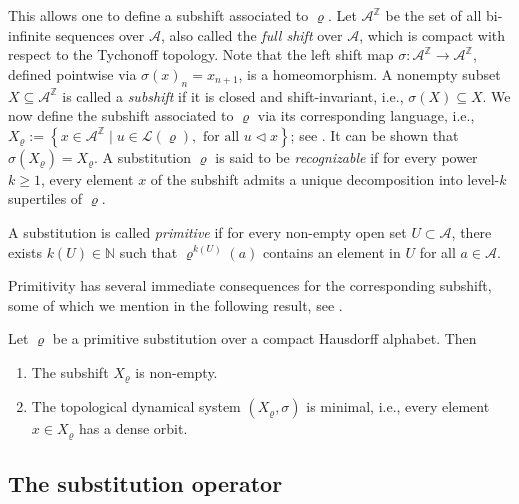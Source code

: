This allows one to define a subshift associated to $\varrho$. Let $\mathcal{A}^{\mathbb{Z}}$ be the set of all bi-infinite sequences over $\mathcal{A}$, also called the \emph{full shift} over $\mathcal{A}$, which is compact with respect to the Tychonoff topology. Note that the left shift map $\sigma\colon \mathcal{A}^{\mathbb{Z}}\to \mathcal{A}^{\mathbb{Z}}$, defined pointwise via $\sigma(x)_n=x_{n+1}$, is a homeomorphism. 
A nonempty subset $X\subseteq \mathcal{A}^{\mathbb{Z}}$ is called a \emph{subshift} if it is closed and shift-invariant, i.e., $\sigma(X)\subseteq X$. 
We now define the subshift associated to $\varrho$ via its corresponding language, i.e., $X_{\varrho}:=\left\{x\in\mathcal{A}^{\mathbb{Z}}\mid u\in\mathcal{L}(\varrho), \text{ for all }u\triangleleft x\right\}$; see \cite{MRW2}. It can be shown that $\sigma(X_{\varrho})=X_{\varrho}$. 
A substitution $\varrho$ is said to be \emph{recognizable} if for every power $k\geqslant 1$, every element $x$ of the subshift admits a unique decomposition into level-$k$ supertiles of $\varrho$.

\begin{definition}
A substitution is called \emph{primitive} if for every non-empty open set $U\subset \mathcal{A}$, there exists $k(U)\in \mathbb{N}$ such that $\varrho^{k(U)}(a)$ contains an element in $U$ for all $a\in\mathcal{A}$. 
\end{definition}

Primitivity has several immediate consequences for the corresponding subshift, some of which we mention in the following result, see \cite[Thm. 3.30]{MRW2}. %

\begin{prop}
Let $\varrho$ be a primitive substitution over a compact Hausdorff alphabet. Then 
\begin{enumerate}
\item[\textnormal{(i)}] The subshift $X_{\varrho}$ is non-empty.
\item[\textnormal{(ii)}] The topological dynamical system $(X_{\varrho},\sigma)$ is minimal, i.e., every element $x\in X_{\varrho}$ has a dense orbit. 
\end{enumerate}
\end{prop}

\subsection{The substitution operator}

